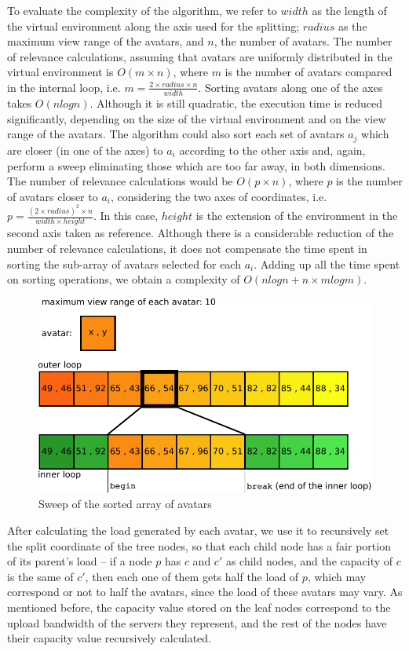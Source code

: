 \documentclass[acmjacm]{acmtrans2m}
\begin{document}
To evaluate the complexity of the algorithm, we refer to $width$ as the length of the virtual environment along the axis used for the splitting; $radius$ as the maximum view range of the avatars, and $n$, the number of avatars. The number of relevance calculations, assuming that avatars are uniformly distributed in the virtual environment is \mbox{$O(m \times n)$}, where $m$ is the number of avatars compared in the internal loop, i.e. \mbox{$m = \frac{2 \times radius \times n}{width}$}. Sorting avatars along one of the axes takes $O(nlogn)$. Although it is still quadratic, the execution time is reduced significantly, depending on the size of the virtual environment and on the view range of the avatars. The algorithm could also sort each set of avatars $a_j$ which are closer (in one of the axes) to $a_i$ according to the other axis and, again, perform a sweep eliminating those which are too far away, in both dimensions. The number of relevance calculations would be \mbox{$O(p \times n)$}, where $p$ is the number of avatars closer to $a_i$, considering the two axes of coordinates, i.e. \mbox{$p = \frac{(2 \times radius)^2 \times n}{width \times height}$}. In this case, $height$ is the extension of the environment in the second axis taken as reference. Although there is a considerable reduction of the number of relevance calculations, it does not compensate the time spent in sorting the sub-array of avatars selected for each $a_i$. Adding up all the time spent on sorting operations, we obtain a complexity of \mbox{$O(nlogn + n \times mlogm)$}.

\begin{figure}
  \centering
  \includegraphics[width=0.8\linewidth]{images/sweep}
  \caption{Sweep of the sorted array of avatars}
   \label{fig:sweep}
\end{figure}

After calculating the load generated by each avatar, we use it to recursively set the split coordinate of the tree nodes, so that each child node has a fair portion of its parent's load -- if a node $p$ has $c$ and $c'$ as child nodes, and the capacity of $c$ is the same of $c'$, then each one of them gets half the load of $p$, which may correspond or not to half the avatars, since the load of these avatars may vary. As mentioned before, the capacity value stored on the leaf nodes correspond to the upload bandwidth of the servers they represent, and the rest of the nodes have their capacity value recursively calculated.
\end{document}
